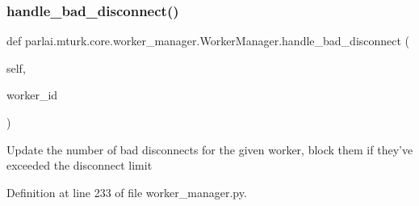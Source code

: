 \subsubsection{\texorpdfstring{handle\+\_\+bad\+\_\+disconnect()}{handle\_bad\_disconnect()}}
{\footnotesize\ttfamily def parlai.\+mturk.\+core.\+worker\+\_\+manager.\+Worker\+Manager.\+handle\+\_\+bad\+\_\+disconnect (\begin{DoxyParamCaption}\item[{}]{self,  }\item[{}]{worker\+\_\+id }\end{DoxyParamCaption})}

\begin{DoxyVerb}Update the number of bad disconnects for the given worker, block
them if they've exceeded the disconnect limit
\end{DoxyVerb}
 

Definition at line 233 of file worker\+\_\+manager.\+py.



